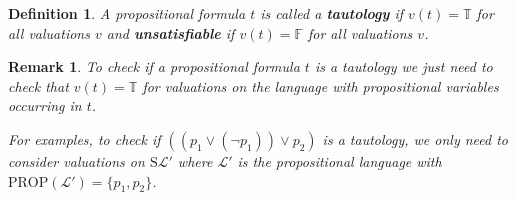 \documentclass[11pt]{article}
\newcommand{\PROP}{\mathrm{PROP}}
\newcommand{\PF}{\mathrm{S}}
\newtheorem{example}[theorem]{Example}
\newtheorem{remark}[theorem]{Remark}
\newtheorem{definition}[theorem]{Definition}
\newcommand{\mcal}[1]{\mathcal{#1}}
\newcommand{\F}{\mathbb{F}}
\newcommand{\T}{\mathbb{T}}
\begin{document}
\begin{definition}
A propositional formula $t$ is called a \textbf{tautology} if $v(t)=\T$ for all valuations $v$ and \textbf{unsatisfiable} if $v(t)=\F$ for all valuations $v$.
\end{definition}

\begin{remark}
To check if a propositional formula $t$ is a tautology we just need to check that $v(t)=\T$ for valuations on the language with propositional variables occurring in $t$.

For examples, to check if $((p_1\vee (\neg p_1))\vee p_2)$ is a tautology, we only need to consider valuations on $\PF\mcal{L}'$ where $\mcal{L}'$ is the propositional language with $\PROP(\mcal{L}')=\{p_1,p_2\}$.
\end{remark}


%
%
\end{document}
